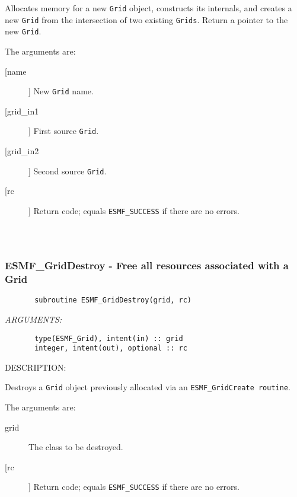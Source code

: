{       Allocates memory for a new {\tt Grid} object, constructs its
       internals, and creates a new {\tt Grid} from the intersection of two
       existing {\tt Grids}.  Return a pointer to the new {\tt Grid}.
  
       The arguments are:
       \begin{description}
       \item[[name]] 
            New {\tt Grid} name.
       \item[[grid\_in1]] 
            First source {\tt Grid}.
       \item[[grid\_in2]] 
            Second source {\tt Grid}.
       \item[[rc]] 
            Return code; equals {\tt ESMF\_SUCCESS} if there are no errors.
     \end{description}
  
\begin{verbatim} \end{verbatim}
 
 
\mbox{}\hrulefill\ 
 
\subsubsection{ESMF\_GridDestroy - Free all resources associated with a Grid }


\begin{verbatim}       subroutine ESMF_GridDestroy(grid, rc)\end{verbatim}{\em ARGUMENTS:}
\begin{verbatim}       type(ESMF_Grid), intent(in) :: grid   
       integer, intent(out), optional :: rc        \end{verbatim}
{\sf DESCRIPTION:\\ }


       Destroys a {\tt Grid} object previously allocated
       via an {\tt ESMF\_GridCreate routine}.
  
       The arguments are:
       \begin{description}
       \item[grid] 
            The class to be destroyed.
       \item[[rc]] 
            Return code; equals {\tt ESMF\_SUCCESS} if there are no errors.
       \end{description}
   
}
